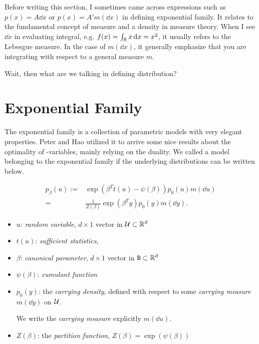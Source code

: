 \clearpage

Before writing this section, I sometimes came across expressions such as
$p(x) = A \dd{x}$ or $p(x) = A' m(\dd{x})$ in defining exponential family.
It relates to the fundamental concept of measure and a density in measure theory.
When I see $\dd{x}$ in evaluating integral, e.g. $f(x) = \int_{\mathbb{R}} x \dd{x} = x^2$,
it usually refers to the Lebesgue measure. 
In the case of $m(\dd{x})$, it generally emphasize that you are integrating 
with respect to a general measure $m$.

Wait, then what are we talking in defining distribution?


\section{Exponential Family}

The exponential family is a collection of parametric models with very elegant properties.
Peter and Hao utilized it to arrive some nice results about
the optimality of \E-variables, mainly relying on the duality.
We called a model belonging to the exponential family 
if the underlying distributions can be written below.

    
\begin{define}
    \begin{align}\label{eq:exp=family}
        p_\beta(u) 
        :=& \exp\left(\beta^T t(u) - \psi(\beta)\right) p_0(u)m(\dd{u}) \\
        =& \frac{1}{Z(\beta)} \exp(\beta^T y) p_0(y) m(\dd{y}).
    \end{align}
\end{define}

\begin{itemize}
    \item $u$: \emph{random variable}, $d \times 1$ vector in $\mathcal{U} \subset \mathbb{R}^d$
    \item $t(u)$: \emph{sufficient statistics},
    \item $\beta$: \emph{canonical parameter}, $d \times 1 $ vector in $\mathtt{B} \subset \mathbb{R}^d$
    \item $\psi(\beta)$: \emph{cumulant function}
    \item $p_0(y)$: the \emph{carrying density}, defined with respect to some 
        \emph{carrying measure} $m(\dd{y})$ on $\mathcal{U}$.

        We write the \emph{carrying measure} explicitly $m(\dd{u})$.
    \item $Z(\beta)$: the \emph{partition function}, $Z(\beta) = \exp(\psi(\beta))$
\end{itemize}

